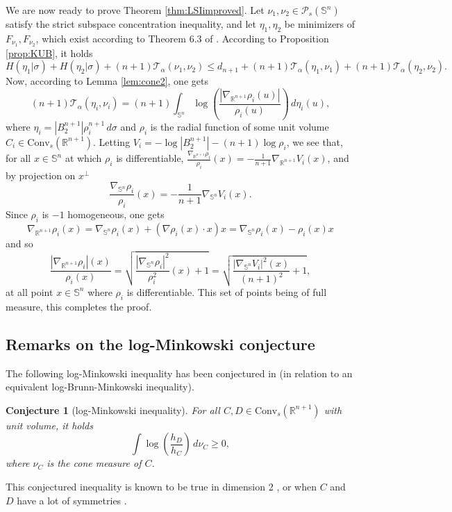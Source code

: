 \documentclass[10pt]{amsart}
\newtheorem{conj}[thm]{Conjecture}
\theoremstyle{definition}
\theoremstyle{remark}
\newcommand{\R}{\mathbb{R}}
\newcommand{\Sd}{\mathbb{S}}
\begin{document}
We are now ready to prove Theorem \ref{thm:LSIimproved}.
Let $\nu_1,\nu_2 \in \mathcal{P}_s(\Sd^n)$ satisfy the strict subspace concentration inequality, and let $\eta_1,\eta_2$ be minimizers of $F_{\nu_1}, F_{\nu_2}$, which exist according to Theorem 6.3 of \cite{BLYZ13}. 
According to Proposition \ref{prop:KUB}, it holds
\[
H(\eta_1|\sigma) + H(\eta_2|\sigma)+(n+1) \mathcal{T}_{\alpha}(\nu_1,\nu_2) \leq d_{n+1} + (n+1)\mathcal{T}_\alpha(\eta_1,\nu_1) + (n+1)\mathcal{T}_\alpha(\eta_2,\nu_2).
\]
Now, according to Lemma \ref{lem:cone2}, one gets
\[
(n+1)\mathcal{T}_\alpha(\eta_i,\nu_i) = (n+1)\int_{\Sd^n} \log \left(\frac{|\nabla_{\R^{n+1}} \rho_i(u)|}{\rho_i(u)}\right)\,d\eta_i(u),
\]
where $\eta_i = |B_2^{n+1}|\rho_i^{n+1}\,d\sigma$ and $\rho_i$ is the radial function of some unit volume $C_i \in \mathrm{Conv}_s(\R^{n+1})$. Letting $V_i= - \log |B_2^{n+1}| - (n+1) \log \rho_i$, we see that, for all $x\in \Sd^n$ at which $\rho_i$ is differentiable, $\frac{\nabla_{\R^{n+1}} \rho_i}{\rho_i}(x) = - \frac{1}{n+1} \nabla_{\R^{n+1}} V_i(x)$, and by projection on $x^\perp$
\[
\frac{\nabla_{\Sd^n} \rho_i}{\rho_i}(x) = - \frac{1}{n+1} \nabla_{\Sd^n} V_i(x).
\]
Since $\rho_i$ is $-1$ homogeneous, one gets
\[
\nabla_{\R^{n+1}} \rho_i(x) = \nabla_{\Sd^n} \rho_i(x)+ \left(\nabla \rho_i(x)\cdot x\right)x = \nabla_{\Sd^n} \rho_i(x) -\rho_i(x)x
\]
and so 
\[
\frac{|\nabla_{\R^{n+1}} \rho_i|(x)}{\rho_i(x)} = \sqrt{\frac{|\nabla_{\Sd^n} \rho_i|^2}{\rho_i^2}(x)+1} = \sqrt{\frac{|\nabla_{\Sd^n} V_i|^2(x)}{(n+1)^2}+1},
\]
at all point $x \in \Sd^n$ where $\rho_i$ is differentiable. This set of points being of full measure, this completes the proof.
\endproof

\subsection{Remarks on the log-Minkowski conjecture}
The following log-Minkowski inequality has been conjectured in \cite{BLYZ12} (in relation to an equivalent log-Brunn-Minkowski inequality).
\begin{conj}[log-Minkowski inequality]\label{conj:LogM}
For all $C,D \in \mathrm{Conv}_s(\R^{n+1})$ with unit volume, it holds
\[
\int \log\left(\frac{h_D}{h_C}\right)\,d\nu_C \geq 0,
\]
where $\nu_C$ is the cone measure of $C$.
\end{conj}
This conjectured inequality is known to be true in dimension 2 \cite{BLYZ12}, or when $C$ and $D$ have a lot of symmetries \cite{Sar15,BK22}.
\end{document}
